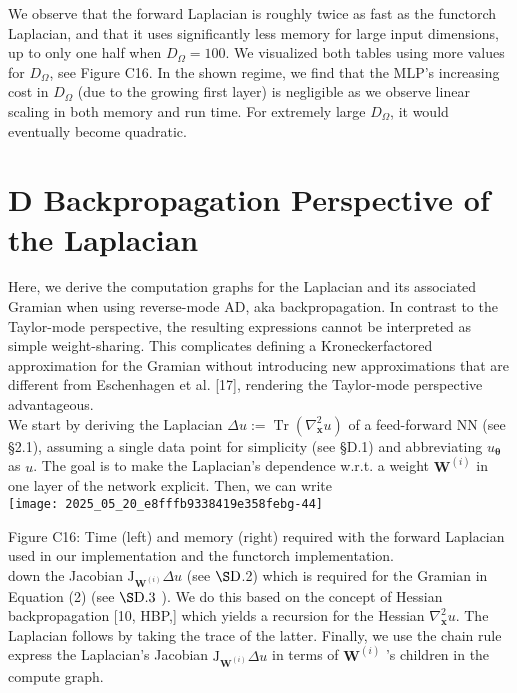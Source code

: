 \documentclass[10pt]{article}
\begin{document}
We observe that the forward Laplacian is roughly twice as fast as the functorch Laplacian, and that it uses significantly less memory for large input dimensions, up to only one half when $D_{\Omega}=100$. We visualized both tables using more values for $D_{\Omega}$, see Figure C16. In the shown regime, we find that the MLP's increasing cost in $D_{\Omega}$ (due to the growing first layer) is negligible as we observe linear scaling in both memory and run time. For extremely large $D_{\Omega}$, it would eventually become quadratic.

\section*{D Backpropagation Perspective of the Laplacian}
Here, we derive the computation graphs for the Laplacian and its associated Gramian when using reverse-mode AD, aka backpropagation. In contrast to the Taylor-mode perspective, the resulting expressions cannot be interpreted as simple weight-sharing. This complicates defining a Kroneckerfactored approximation for the Gramian without introducing new approximations that are different from Eschenhagen et al. [17], rendering the Taylor-mode perspective advantageous.\\
We start by deriving the Laplacian $\Delta u:=\operatorname{Tr}\left(\nabla_{\boldsymbol{x}}^{2} u\right)$ of a feed-forward NN (see §2.1), assuming a single data point for simplicity (see §D.1) and abbreviating $u_{\boldsymbol{\theta}}$ as $u$. The goal is to make the Laplacian's dependence w.r.t. a weight $\boldsymbol{W}^{(i)}$ in one layer of the network explicit. Then, we can write\\
\texttt{[image: 2025\_05\_20\_e8fffb9338419e358febg-44]}

Figure C16: Time (left) and memory (right) required with the forward Laplacian used in our implementation and the functorch implementation.\\
down the Jacobian $\mathrm{J}_{\boldsymbol{W}^{(i)}} \Delta u$ (see $\S \mathrm{D}$.2) which is required for the Gramian in Equation (2) (see $\S \mathrm{D} .3$ ). We do this based on the concept of Hessian backpropagation [10, HBP,] which yields a recursion for the Hessian $\nabla_{\boldsymbol{x}}^{2} u$. The Laplacian follows by taking the trace of the latter. Finally, we use the chain rule express the Laplacian's Jacobian $\mathrm{J}_{\boldsymbol{W}^{(i)}} \Delta u$ in terms of $\boldsymbol{W}^{(i)}$ 's children in the compute graph.
\end{document}
